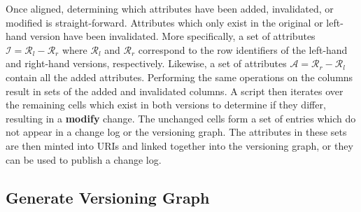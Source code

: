 Once aligned, determining which attributes have been added, invalidated, or modified is straight-forward.
Attributes which only exist in the original or left-hand version have been invalidated.
More specifically, a set of attributes \(\mathcal{I} = \mathcal{R}_{l} - \mathcal{R}_{r}\) where \(\mathcal{R}_{l}\) and \(\mathcal{R}_{r}\) correspond to the row identifiers of the left-hand and right-hand versions, respectively.
Likewise, a set of attributes \(\mathcal{A} = \mathcal{R}_{r} - \mathcal{R}_{l}\) contain all the added attributes.
Performing the same operations on the columns result in sets of the added and invalidated columns.
A script then iterates over the remaining cells which exist in both versions to determine if they differ, resulting in a \textbf{modify} change.
The unchanged cells form a set of entries which do not appear in a change log or the versioning graph.
The attributes in these sets are then minted into URIs and linked together into the versioning graph, or they can be used to publish a change log.

\subsection{Generate Versioning Graph}

